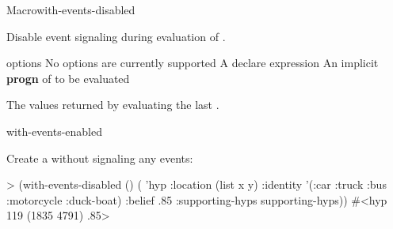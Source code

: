 \documentclass[10pt,twoside,english,pdftex]{article}
\begin{document}

\begin{functiondoc}{Macro}{with-events-disabled}%
  {\code{(}\superstar{}\code{)}
    \superstar{}
    \superstar{}
    \returns{} \superstar}
%
%
  
\fnsyntax

\fnpurpose Disable event signaling during evaluation of .

\fnpackage {}

\fnmodule {}

\fnargs
\begin{args}{options}
\arg[option] No options are currently supported
\arg[declaration] A declare expression
\arg[forms] An implicit \textbf{progn} of  to be evaluated
\end{args}

\fnreturns The values returned by evaluating the last .

\begin{alsos}{with-events-enabled}
\end{alsos}

\fnexample
{}%
Create a  without signaling any events:
\begin{example}
> (with-events-disabled ()
     ( 'hyp 
        :location (list x y)
        :identity '(:car :truck :bus :motorcycle :duck-boat)
        :belief .85
        :supporting-hyps supporting-hyps))
#<hyp 119 (1835 4791) .85>
\end{example}

\end{functiondoc}

\end{document}
